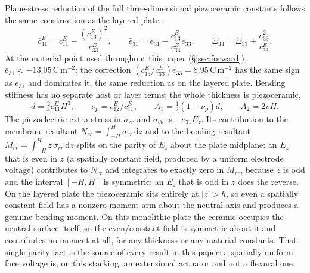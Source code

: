 \documentclass[11pt]{article}
\newcommand{\eebar}{\bar{e}_{31}}
\newcommand{\Xibar}{\bar{\Xi}_{33}}
\newcommand{\cbar}{\bar{c}_{11}^{E}}
\begin{document}
Plane-stress reduction of the full three-dimensional piezoceramic
constants follows the same construction as the layered plate
\cite{liu2002,mccune2026piezo}:
\begin{equation}
\cbar=c_{11}^E-\frac{(c_{13}^E)^2}{c_{33}^E},\qquad
\eebar=e_{31}-\frac{c_{13}^E}{c_{33}^E}e_{33},\qquad
\Xibar=\Xi_{33}+\frac{e_{33}^2}{c_{33}^E}.
\label{eq:reduced}
\end{equation}
At the material point used throughout this paper (\S\ref{sec:forward}),
$\eebar\approx-13.05\,\mathrm{C\,m^{-2}}$: the correction
$(c_{13}^E/c_{33}^E)e_{33}=8.95\,\mathrm{C\,m^{-2}}$ has the same sign as
$e_{31}$ and dominates it, the same reduction as on the layered plate. Bending stiffness has no separate host or
layer terms; the whole thickness is piezoceramic,
\begin{equation}
d=\tfrac{2}{3}\cbar H^3,\qquad
\nu_p=\bar c_{12}^E/\cbar,\qquad
A_1=\tfrac12(1-\nu_p)d,\qquad
A_2=2\rho H.
\label{eq:d}
\end{equation}
The piezoelectric extra stress in $\sigma_{rr}$ and $\sigma_{\theta\theta}$
is $-\eebar E_z$. Its contribution to the membrane resultant
$N_{rr}=\int_{-H}^{H}\sigma_{rr}\,\mathrm dz$ and to the bending resultant
$M_{rr}=\int_{-H}^{H}z\,\sigma_{rr}\,\mathrm dz$ splits on the parity of
$E_z$ about the plate midplane: an $E_z$ that is even in $z$ (a spatially
constant field, produced by a uniform electrode voltage) contributes to
$N_{rr}$ and integrates to exactly zero in $M_{rr}$, because $z$ is odd
and the interval $[-H,H]$ is symmetric; an $E_z$ that is odd in $z$ does
the reverse. On the layered plate the piezoceramic sits entirely at
$\lvert z\rvert>h$, so even a spatially constant field has a nonzero
moment arm about the neutral axis and produces a genuine bending moment.
On this monolithic plate the ceramic occupies the neutral surface itself,
so the even/constant field is symmetric about it and contributes no
moment at all, for any thickness or any material constants. That single
parity fact is the source of every result in this paper: a spatially
uniform face voltage is, on this stacking, an extensional actuator and
not a flexural one.
\end{document}
